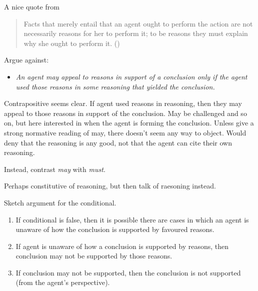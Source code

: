 \documentclass[10pt]{article}
\begin{document}
\begin{note}[Broome]
  A nice quote from \textcite{Broome:2013aa}

  \begin{quote}
    Facts that merely entail that an agent ought to perform the action are not necessarily reasons for her to perform it; to be reasons they must explain why she ought to perform it.\nolinebreak
    \mbox{}\hfill\mbox{(\citeyear[51]{Broome:2013aa})}
  \end{quote}
\end{note}

\newpage

\maketitle

Argue against:
\begin{itemize}
\item\label{denied-claim} \emph{An agent may appeal to reasons in support of a conclusion only if the agent used those reasons in some reasoning that yielded the conclusion.}
\end{itemize}

Contrapositive seems clear.
If agent used reasons in reasoning, then they may appeal to those reasons in support of the conclusion.
May be challenged and so on, but here interested in when the agent is forming the conclusion.
Unless give a strong normative reading of may, there doesn't seem any way to object.
Would deny that the reasoning is any good, not that the agent can cite their own reasoning.

Instead, contrast \emph{may} with \emph{must}.

Perhaps constitutive of reasoning, but then talk of raesoning instead.

Sketch argument for the conditional.

\begin{enumerate}
\item\label{opp:sketch:1} If conditional is false, then it is possible there are cases in which an agent is unaware of how the conclusion is supported by favoured reasons.
\item\label{opp:sketch:2} If agent is unaware of how a conclusion is supported by reasons, then conclusion may not be supported by those reasons.
\item\label{opp:sketch:3} If conclusion may not be supported, then the conclusion is not supported (from the agent's perspective).
\end{enumerate}
\end{document}
